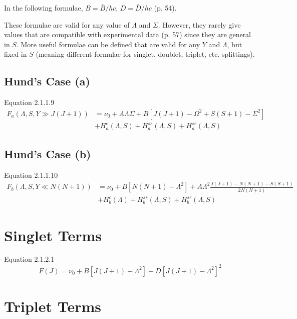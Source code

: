 \documentclass[11pt, twoside, fleqn]{report}
\begin{document}
In the following formulae, $B = \bar{B}/hc$, $D = \bar{D}/hc$ (p. 54).

These formulae are valid for any value of $\Lambda$ and $\Sigma$. However, they rarely give values that are compatible with experimental data (p. 57) since they are general in $S$. More useful formulae can be defined that are valid for any $Y$ and $\Lambda$, but fixed in $S$ (meaning different formulae for singlet, doublet, triplet, etc. splittings).

\subsection{Hund's Case (a)}

Equation 2.1.1.9
\begin{align*}
    F_a(\Lambda, S, Y \gg J(J + 1)) & = \nu_0 + A\Lambda\Sigma + B[J(J + 1) - \Omega^2 + S(S + 1) -\Sigma^2] \\
    & + H_a^c(\Lambda, S) + H_a^{ss}(\Lambda, S) + H_a^{sr}(\Lambda, S)
\end{align*}

\subsection{Hund's Case (b)}

Equation 2.1.1.10
\begin{align*}
    F_b(\Lambda, S, Y \ll N(N + 1)) & = \nu_0 + B[N(N + 1) - \Lambda^2] + A\Lambda^2\frac{J(J + 1) - N(N + 1) - S(S + 1)}{2N(N + 1)} \\
    & + H_b^c(\Lambda) + H_b^{ss}(\Lambda, S) + H_b^{sr}(\Lambda, S)
\end{align*}

\section{Singlet Terms}


Equation 2.1.2.1
\begin{equation*}
    F(J) = \nu_0 + B[J(J + 1) - \Lambda^2] - D[J(J + 1) - \Lambda^2]^2
\end{equation*}

\section{Triplet Terms}
\end{document}
